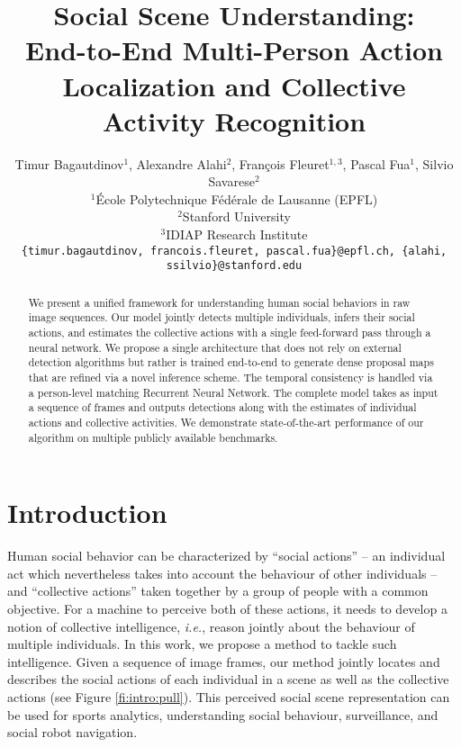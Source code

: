 \documentclass[10pt,twocolumn,letterpaper]{article}
\begin{document}
\title{Social Scene Understanding:\\ End-to-End Multi-Person Action Localization and Collective Activity Recognition}

\author{Timur Bagautdinov$^1$, 
Alexandre Alahi$^2$, 
François Fleuret$^{1,3}$, 
Pascal Fua$^1$, 
Silvio Savarese$^2$\\
$^1$École Polytechnique Fédérale de Lausanne (EPFL)\\
$^2$Stanford University\\
$^3$IDIAP Research Institute\\
{\tt\small \{timur.bagautdinov, francois.fleuret, pascal.fua\}@epfl.ch, 
{\tt\small \{alahi, ssilvio\}@stanford.edu}}
}

\maketitle




\begin{abstract}
We present a unified framework for understanding human social behaviors in raw image
sequences. 
Our model jointly detects multiple individuals, infers their social actions, and 
estimates the collective actions with a single feed-forward pass through a neural network. 
We propose a single architecture that does not rely on external detection 
algorithms but rather is trained end-to-end to generate
dense proposal maps that are refined via a novel inference scheme.
The temporal consistency is handled via a person-level matching Recurrent Neural
Network. The complete model takes as input a sequence of frames and outputs
detections along with the estimates of individual actions and collective activities. We
demonstrate state-of-the-art performance of our algorithm on multiple publicly
available benchmarks.
\end{abstract}



\vspace{-0.5cm}
\section{Introduction}
\vspace{-0.15cm}

Human social behavior can be characterized by ``social actions'' -- an
individual act which nevertheless takes into account the behaviour of other
individuals -- and ``collective actions'' taken together by a group of people
with a common objective. For a machine to perceive both of these actions, it
needs to develop a notion of collective intelligence, \textit{i.e.}, reason
jointly about the behaviour of multiple individuals. In this work, we propose a
method to tackle such intelligence. Given a sequence of image frames, our method 
jointly locates and describes the
social actions of each individual in a scene as well as the collective actions (see
Figure \ref{fi:intro:pull}). This perceived social scene representation can be
used for sports analytics, understanding social behaviour, surveillance, and
social robot navigation.
\end{document}
